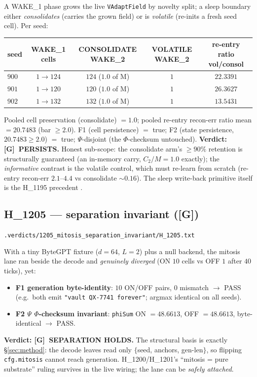 \documentclass[11pt,a4paper]{article}
\providecommand{\tierGreen}{\textbf{[G]}}
\newcommand{\verdict}[1]{\texttt{\small #1}}
\newcommand{\recon}{\mathrm{recon\text{-}err}}
\begin{document}
A WAKE\_1 phase grows the live \verb|VAdaptField| by novelty split; a sleep
boundary either \emph{consolidates} (carries the grown field) or is
\emph{volatile} (re-inits a fresh seed cell). Per seed:
\begin{center}
\begin{tabular}{lcccc}
\toprule
seed & WAKE\_1 cells & CONSOLIDATE WAKE\_2 & VOLATILE WAKE\_2 & re-entry ratio vol/consol \\
\midrule
$900$ & $1\to124$ & $124$ ($1.0$ of M) & $1$ & $22.3391$ \\
$901$ & $1\to120$ & $120$ ($1.0$ of M) & $1$ & $26.3627$ \\
$902$ & $1\to132$ & $132$ ($1.0$ of M) & $1$ & $13.5431$ \\
\bottomrule
\end{tabular}
\end{center}
Pooled cell preservation (consolidate) $=1.0$; pooled re-entry $\recon$ ratio
mean $=20.7483$ (bar $\ge 2.0$). F1 (cell persistence) $=$ true; F2 (state
persistence, $20.7483 \ge 2.0$) $=$ true; $\Psi$-disjoint (the $\Phi$-checksum
untouched). \textbf{Verdict: \tierGreen\ PERSISTS.} Honest sub-scope: the
consolidate arm's $\ge 90\%$ retention is structurally guaranteed (an in-memory
carry, $C_2/M=1.0$ exactly); the \emph{informative} contrast is the volatile
control, which must re-learn from scratch (re-entry $\recon$ $2.1$--$4.4$ vs
consolidate $\sim 0.16$). The sleep write-back primitive itself is the H\_1195
precedent \citep{anima_H1195}.

\subsection{H\_1205 --- separation invariant (\tierGreen)}
\label{sec:separation}
\noindent\verdict{.verdicts/1205\_mitosis\_separation\_invariant/H\_1205.txt}

With a tiny ByteGPT fixture ($d=64$, $L=2$) plus a null backend, the mitosis
lane ran beside the decode and \emph{genuinely diverged} (ON $10$ cells vs OFF
$1$ after $40$ ticks), yet:
\begin{itemize}\itemsep0.15em
\item \textbf{F1 generation byte-identity}: $10$ ON/OFF pairs, $0$ mismatch
      $\to$ PASS (e.g.\ both emit \texttt{"vault QX-7741 forever"}; argmax
      identical on all seeds).
\item \textbf{F2 $\Psi$ $\Phi$-checksum invariant}: \texttt{phiSum} ON
      $=48.6613$, OFF $=48.6613$, byte-identical $\to$ PASS.
\end{itemize}
\textbf{Verdict: \tierGreen\ SEPARATION HOLDS.} The structural basis is exactly
\S\ref{sec:method}: the decode leaves read only $\{$seed, anchors, gen-len$\}$,
so flipping \verb|cfg.mitosis| cannot reach generation. H\_1200/H\_1201's
``mitosis = pure substrate'' ruling survives in the live wiring; the lane can be
\emph{safely attached}.
\end{document}
